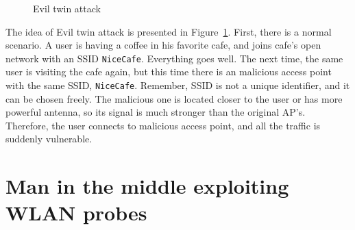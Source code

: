 \documentclass[12pt,a4paper,oneside,pdftex]{report}
\begin{document}
\begin{figure}
    \begin{center}
    \caption{Evil twin attack}
    \label{fig:evil_twin}
    \end{center}
\end{figure}

The idea of Evil twin attack is presented in Figure~\ref{fig:evil_twin}. First, there is a normal scenario. A user is having a coffee in his favorite cafe, and joins cafe's open network with an SSID \texttt{NiceCafe}. Everything goes well. The next time, the same user is visiting the cafe again, but this time there is an malicious access point with the same SSID, \texttt{NiceCafe}. Remember, SSID is not a unique identifier, and it can be chosen freely. The malicious one is located closer to the user or has more powerful antenna, so its signal is much stronger than the original AP's. Therefore, the user connects to malicious access point, and all the traffic is suddenly vulnerable.

\section{Man in the middle exploiting WLAN probes}
\end{document}
